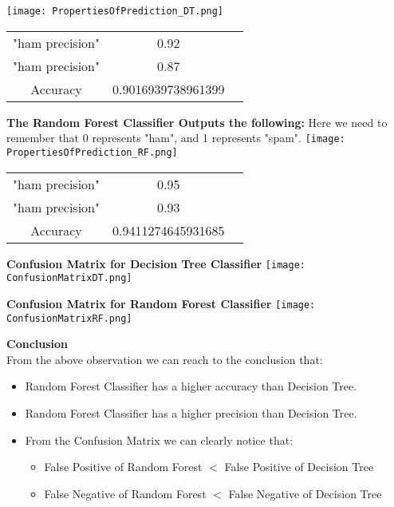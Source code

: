 \documentclass{article}
\begin{document}
\texttt{[image: PropertiesOfPrediction\_DT.png]}
\begin{center}
\begin{tabular}{ |c|c|c| } 
 \hline
 "ham precision" & 0.92  \\ 
 "ham precision" & 0.87 \\ 
 Accuracy  & 0.9016939738961399 \\ 
 \hline
\end{tabular}
\end{center}
\vspace{1cm}
\textbf{The Random Forest Classifier Outputs the following: }
Here we need to remember that 0 represents "ham", and 1 represents "spam".
\texttt{[image: PropertiesOfPrediction\_RF.png]}

\begin{center}
\begin{tabular}{ |c|c|c| } 
 \hline
 "ham precision" & 0.95  \\ 
 "ham precision" & 0.93 \\ 
 Accuracy  & 0.9411274645931685 \\ 
 \hline
\end{tabular}
\end{center}
\vspace{7cm}
\centering
\textbf{Confusion Matrix for Decision Tree Classifier}
\vspace{0.5cm}
\centering
\texttt{[image: ConfusionMatrixDT.png]}

\centering
\textbf{Confusion Matrix for Random Forest Classifier}
\centering
\texttt{[image: ConfusionMatrixRF.png]}

\newpage
\textbf{Conclusion}
\\
From the above observation we can reach to the conclusion that: 
\begin{itemize}
    \item Random Forest Classifier has a higher accuracy than Decision Tree.
    \item Random Forest Classifier has a higher precision than Decision Tree.
    \item From the Confusion Matrix we can clearly notice that:
    \begin{itemize}
        \item False Positive of Random Forest $<$ False Positive of Decision Tree
        \item False Negative of Random Forest $<$ False Negative of Decision Tree
    \end{itemize}
\end{itemize}
\end{document}
